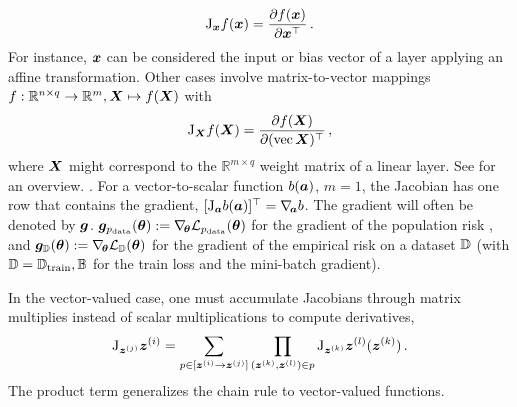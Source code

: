 \begin{definition}
{    \begin{align*}
      \mathrm{J}_{{\bm{x}}} f({\bm{x}}) = \frac{\partial f({\bm{x}})}{\partial {\bm{x}}^\top}\,.
    \end{align*}
    For instance, ${\bm{x}}$ can be considered the input or bias vector of a layer
    applying an affine transformation. Other cases involve matrix-to-vector mappings
    $f: \mathbb{R}^{n\times q} \to \mathbb{R}^m, {\bm{X}} \mapsto f({\bm{X}})$ with
    \begin{align*}
      \mathrm{J}_{{\bm{X}}} f({\bm{X}}) = \frac{\partial f({\bm{X}})}{\partial (\operatorname{vec} {\bm{X}})^\top}\,,
    \end{align*}
    where ${\bm{X}}$ might correspond to the $\mathbb{R}^{m\times q}$ weight matrix
    of a linear layer. See  for an overview.
  }.
  For a vector-to-scalar function $b({\bm{a}})$, \ie $m=1$, the Jacobian has one row
  that contains the gradient, $[\mathrm{J}_{{\bm{a}}} b({\bm{a}})]^{\top} = \nabla_{\!{{\bm{a}}}}b$. The
  gradient will often be denoted by ${\bm{g}}$. \Eg ${\bm{g}}_{p_{\mathrm{data}}}({\bm{\theta}}) :=
  \nabla_{\!{{\bm{\theta}}}} {\mathcal{L}}_{p_{\mathrm{data}}}({\bm{\theta}})$ for the gradient of the population risk
  , and ${\bm{g}}_{{\mathbb{D}}}({\bm{\theta}}) := \nabla_{\!{{\bm{\theta}}}}
  {\mathcal{L}}_{{\mathbb{D}}}({\bm{\theta}})$ for the gradient of the empirical risk
   on a dataset ${\mathbb{D}}$ (with ${\mathbb{D}} = {\mathbb{D}}_{\mathrm{train}}, {\mathbb{B}}$
  for the train loss and the mini-batch gradient).
\end{definition}

In the vector-valued case, one must accumulate Jacobians through matrix
multiplies instead of scalar multiplications to compute derivatives,
\begin{align}\label{eq:background::BauersFormulaVector}
  \mathrm{J}_{{\bm{z}}^{(j)}}{\bm{z}}^{(i)}
  =
  \sum_{p \in [{\bm{z}}^{(i)} \to {\bm{z}}^{(j)}]}
  \prod_{({\bm{z}}^{(k)}, {\bm{z}}^{(l)}) \in p}
  \mathrm{J}_{{\bm{z}}^{(k)}}{\bm{z}}^{(l)}({\bm{z}}^{(k)})\,.
\end{align}
The product term generalizes the chain rule to vector-valued functions.


